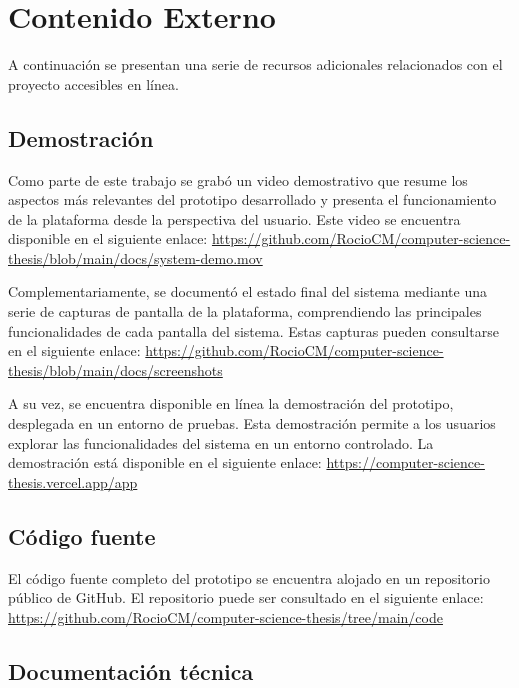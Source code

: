 \chapter[Contenido externo]{Contenido Externo}
\label{cp:annex-content}

\parindent0pt

A continuación se presentan una serie de recursos adicionales relacionados con el proyecto accesibles en línea.

\section{Demostración}
\label{sec:results-demo}

Como parte de este trabajo se grabó un video demostrativo que resume los aspectos más relevantes del prototipo desarrollado y presenta el funcionamiento de la plataforma desde la perspectiva del usuario. Este video se encuentra disponible en el siguiente enlace: 
\url{https://github.com/RocioCM/computer-science-thesis/blob/main/docs/system-demo.mov} %

Complementariamente, se documentó el estado final del sistema mediante una serie de capturas de pantalla de la plataforma, comprendiendo las principales funcionalidades de cada pantalla del sistema. Estas capturas pueden consultarse en el siguiente enlace: \url{https://github.com/RocioCM/computer-science-thesis/blob/main/docs/screenshots} %

A su vez, se encuentra disponible en línea la demostración del prototipo, desplegada en un entorno de pruebas. Esta demostración permite a los usuarios explorar las funcionalidades del sistema en un entorno controlado. La demostración está disponible en el siguiente enlace: \url{https://computer-science-thesis.vercel.app/app}

\section{Código fuente}
\label{sec:source-code}

El código fuente completo del prototipo se encuentra alojado en un repositorio público de GitHub. El repositorio puede ser consultado en el siguiente enlace: \url{https://github.com/RocioCM/computer-science-thesis/tree/main/code}

\section{Documentación técnica}
\label{sec:technical-docs}

